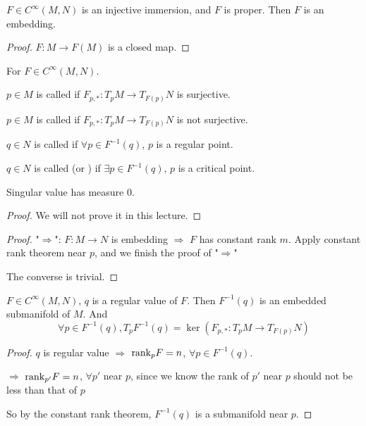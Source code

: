 \begin{proposition}
    $ F\in C^\infty(M,N)  $ is an injective immersion, and  $ F $ is proper. Then  $ F $ is an embedding.   
\end{proposition}
\begin{proof}
    $ F:M\rightarrow F(M) $ is a closed map. 
\end{proof}
\begin{definition}
    For  $ F\in C^\infty(M,N) $.
    
    $ p\in M $ is called  if  $ F_{p,*}:T_pM\rightarrow T_{F(p)}N $ is surjective.
    
    $ p\in M $ is called  if  $ F_{p,*}:T_pM\rightarrow T_{F(p)}N $ is not surjective. 
    
    $ q \in N$ is called  if  $ \forall p\in F^{-1}(q) $,  $ p $ is a regular point.
    
    $ q\in N $ is called (or ) if  $ \exists p\in F^{-1}(q) $,  $ p $ is a critical point. 
\end{definition}
\begin{theorem}[Sard]
    Singular value has measure  $ 0 $. 
\end{theorem}
\begin{proof}
    We will not prove it in this lecture. 
\end{proof}
\begin{proof}
    "$ \Rightarrow $": $ F:M\rightarrow N $ is embedding  $ \Rightarrow  $ $ F $ has constant rank  $ m $. Apply constant rank theorem near  $ p $, and we finish the proof of  "$\Rightarrow $"

    The converse is trivial.
    
\end{proof}
\begin{theorem}
    $ F\in C^\infty(M,N) $,  $ q $ is a regular value of  $ F $. Then  $ F^{-1}(q) $ is an embedded submanifold of  $ M $. And 
    \[\forall p\in F^{-1}(q),T_pF^{-1}(q)=\ker(F_{p,*}:T_pM\rightarrow T_{F(p)}N)\]     
\end{theorem}
\begin{proof}
    $ q $ is regular value $ \Rightarrow  $ $ \mathrm{rank}_pF=n $, $ \forall p\in F^{-1}(q) $.

    $ \Rightarrow  $ $ \mathrm{rank}_{p'}F=n $,  $ \forall p' $ near  $ p $, since we know  the rank of  $ p' $ near  $ p $ should not be less than that of  $ p $ 
    
    So by the constant rank theorem,  $ F^{-1}(q) $ is a submanifold near  $ p $.  
    
\end{proof}
